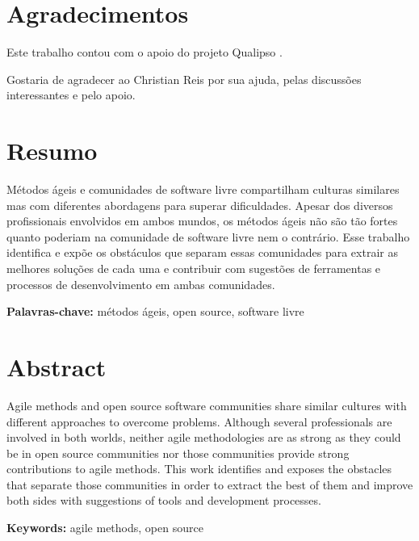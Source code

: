 \documentclass[11pt,twoside,letterpaper]{book}
\begin{document}

\chapter*{Agradecimentos}

Este trabalho contou com o apoio do projeto Qualipso \cite{Qualipso}.

Gostaria de agradecer ao Christian Reis por sua ajuda, pelas
discussões interessantes e pelo apoio.

\chapter*{Resumo}

Métodos ágeis e comunidades de software livre compartilham culturas
similares mas com diferentes abordagens para superar
dificuldades. Apesar dos diversos profissionais envolvidos em ambos
mundos, os métodos ágeis não são tão fortes quanto poderiam na
comunidade de software livre nem o contrário. Esse trabalho identifica
e expõe os obstáculos que separam essas comunidades para extrair as
melhores soluções de cada uma e contribuir com sugestões de
ferramentas e processos de desenvolvimento em ambas comunidades.

\noindent \textbf{Palavras-chave:} métodos ágeis, open source,
software livre

\chapter*{Abstract}

Agile methods and open source software communities share similar
cultures with different approaches to overcome problems. Although
several professionals are involved in both worlds, neither agile
methodologies are as strong as they could be in open source
communities nor those communities provide strong contributions to
agile methods. This work identifies and exposes the obstacles that
separate those communities in order to extract the best of them and
improve both sides with suggestions of tools and development
processes.

\noindent \textbf{Keywords:} agile methods, open source
\end{document}
